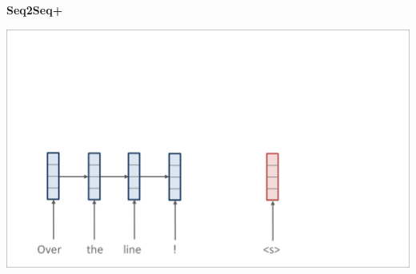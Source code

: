 \documentclass[aspectratio=169]{beamer}
\newcommand{\air}{\vspace{0.25cm}}
\begin{document}
\begin{frame}
  \begin{center}
    \textbf{Seq2Seq+} \air
  \end{center}
\center
\vspace{-5mm}
 \air
\includegraphics[scale=0.37]{nmt-attn1}
\end{frame}
\end{document}
